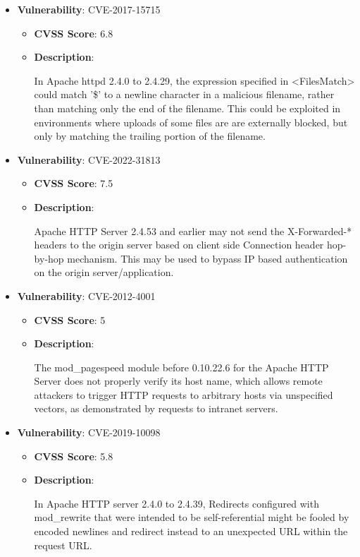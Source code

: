 \documentclass{article}
\begin{document}
\begin{itemize}
        \item \textbf{Vulnerability}: CVE-2017-15715
        \begin{itemize}
            \item \textbf{CVSS Score}:  6.8 
            \item \textbf{Description}:
            \parbox[t]{0.9\linewidth}{
                \ttfamily In Apache httpd 2.4.0 to 2.4.29, the expression specified in <FilesMatch> could match '\$' to a newline character in a malicious filename, rather than matching only the end of the filename. This could be exploited in environments where uploads of some files are are externally blocked, but only by matching the trailing portion of the filename.
            }
        \end{itemize}
    
        \item \textbf{Vulnerability}: CVE-2022-31813
        \begin{itemize}
            \item \textbf{CVSS Score}:  7.5 
            \item \textbf{Description}:
            \parbox[t]{0.9\linewidth}{
                \ttfamily Apache HTTP Server 2.4.53 and earlier may not send the X-Forwarded-* headers to the origin server based on client side Connection header hop-by-hop mechanism. This may be used to bypass IP based authentication on the origin server/application.
            }
        \end{itemize}
    
        \item \textbf{Vulnerability}: CVE-2012-4001
        \begin{itemize}
            \item \textbf{CVSS Score}:  5 
            \item \textbf{Description}:
            \parbox[t]{0.9\linewidth}{
                \ttfamily The mod\_pagespeed module before 0.10.22.6 for the Apache HTTP Server does not properly verify its host name, which allows remote attackers to trigger HTTP requests to arbitrary hosts via unspecified vectors, as demonstrated by requests to intranet servers.
            }
        \end{itemize}
    
        \item \textbf{Vulnerability}: CVE-2019-10098
        \begin{itemize}
            \item \textbf{CVSS Score}:  5.8 
            \item \textbf{Description}:
            \parbox[t]{0.9\linewidth}{
                \ttfamily In Apache HTTP server 2.4.0 to 2.4.39, Redirects configured with mod\_rewrite that were intended to be self-referential might be fooled by encoded newlines and redirect instead to an unexpected URL within the request URL.
            }
        \end{itemize}
    

\end{itemize}
\end{document}
